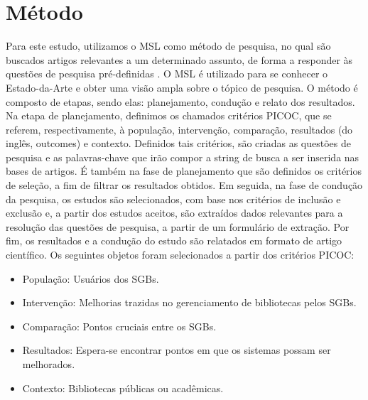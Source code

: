 \documentclass[12pt]{article}
\begin{document}
\section{Método} \label{sec:firstpage}
Para este estudo, utilizamos o MSL como método de pesquisa, no qual são buscados artigos relevantes a um determinado assunto, de forma a responder às questões de pesquisa pré-definidas \cite{PETERSEN20151}. O MSL é utilizado para se conhecer o Estado-da-Arte e obter uma visão ampla sobre o tópico de pesquisa. O método é composto de etapas, sendo elas: planejamento, condução e relato dos resultados. Na etapa de planejamento, definimos os chamados critérios PICOC, que se referem, respectivamente, à população, intervenção, comparação, resultados (do inglês, outcomes) e contexto. Definidos tais critérios, são criadas as questões de pesquisa e as palavras-chave que irão compor a string de busca a ser inserida nas bases de artigos. É também na fase de planejamento que são definidos os critérios de seleção, a fim de filtrar os resultados obtidos. Em seguida, na fase de condução da pesquisa, os estudos são selecionados, com base nos critérios de inclusão e exclusão e, a partir dos estudos aceitos, são extraídos dados relevantes para a resolução das questões de pesquisa, a partir de um formulário de extração. Por fim, os resultados e a condução do estudo são relatados em formato de artigo científico. \newline
Os seguintes objetos foram selecionados a partir dos critérios PICOC:
\begin{itemize}
    \item População: Usuários dos SGBs.
    \item Intervenção: Melhorias trazidas no gerenciamento de bibliotecas pelos SGBs.
    \item Comparação: Pontos cruciais entre os SGBs.
    \item Resultados: Espera-se encontrar pontos em que os sistemas possam ser melhorados.
    \item Contexto: Bibliotecas públicas ou acadêmicas.
\end{itemize}
\end{document}
